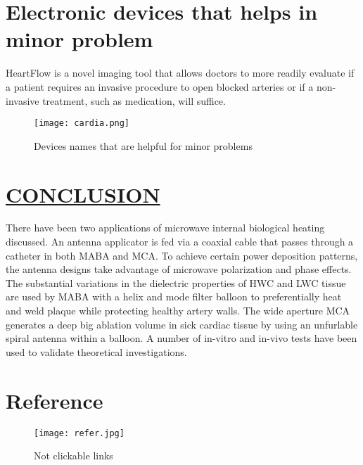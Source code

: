\documentclass[12pts]{article}
\begin{document}
\section*{Electronic devices that helps in minor problem}
\begin{large}
HeartFlow is a novel imaging tool that allows doctors to more readily evaluate if a patient requires an invasive procedure to open blocked arteries or if a non-invasive treatment, such as medication, will suffice.

\begin{figure}[h]
\centering
\texttt{[image: cardia.png]}
\caption{Devices names that are helpful for minor problems}
\end{figure}

\end{large}




\section*{\underline{CONCLUSION}}
\begin{large}
There have been two applications of microwave internal biological heating discussed. An antenna applicator is fed via a coaxial cable that passes through a catheter in both MABA and MCA. To achieve certain power deposition patterns, the antenna designs take advantage of microwave polarization and phase effects. The substantial variations in the dielectric properties of HWC and LWC tissue are used by MABA with a helix and mode filter balloon to preferentially heat and weld plaque while protecting healthy artery walls. The wide aperture MCA generates a deep big ablation volume in sick cardiac tissue by using an unfurlable spiral antenna within a balloon. A number of in-vitro and in-vivo tests have been used to validate theoretical investigations.
\end{large}

\section*{Reference}



\begin{figure}[h]
\centering
\texttt{[image: refer.jpg]}
\caption{Not clickable links}
\end{figure}
\end{document}
